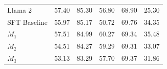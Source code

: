 \documentclass{article}
\begin{document}
\begin{table}[h!]
\begin{tabular}{lccccc}
                \midrule
{Llama 2}                                  & 57.40                                        & 85.30                                                             & 56.80                                                                              & 68.90                                                                                                                                                                     & 25.30                                                                           \\
{SFT Baseline}                                   & 55.97                                       & 85.17                                                          & 50.72                                                                             & 69.76                                                                                                                                                           & 34.35                                                                          \\
{$M_1$}                                    & 57.51                                       & 84.99                                                           & 60.27                                                                             & 69.34                                                                                                                                                         & 35.48                                                                          \\
{$M_2$}                                  & 54.51                                       & 84.27                                                    & 59.29                                                                             & 69.31                                                                                                                                                               & 33.07                                                                          \\
{$M_3$}                                  & 53.13                                       & 83.29                                                      & 57.70                                                                              & 69.37                                                                                                                                                                & 31.86  \\
\bottomrule
\end{tabular}
\end{table}
\end{document}
